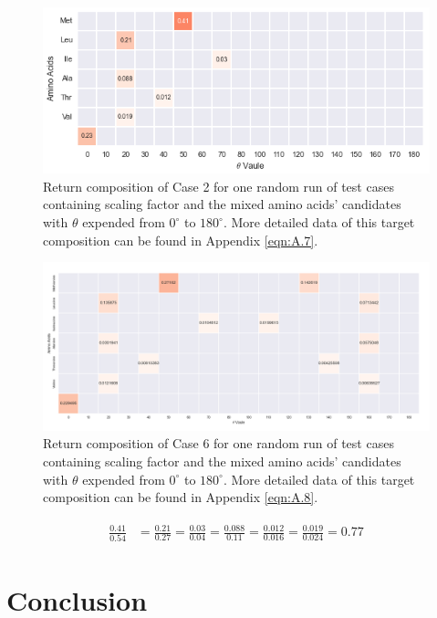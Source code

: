 \begin{figure}[!ht] 
\centering
\includegraphics[scale=0.9]{Figures/chapter6_figure_three.png}
\caption{Return composition of Case 2 for one random run of test cases containing scaling factor and the mixed amino acids' candidates with $\theta$ expended from $0^{\circ}$ to $180^{\circ}$. More detailed data of this target composition can be found in Appendix \ref{eqn:A.7}.} \label{fig:6.5}
\end{figure}

\begin{figure}[!ht] 
\centering
\includegraphics[scale=0.9]{Figures/chapter6_figure_four.png}
\caption{Return composition of Case 6 for one random run of test cases containing scaling factor and the mixed amino acids' candidates with $\theta$ expended from $0^{\circ}$ to $180^{\circ}$. More detailed data of this target composition can be found in Appendix \ref{eqn:A.8}.} \label{fig:6.6}
\end{figure}

\begin{eqnarray} 
\begin{split}
\frac{0.41}{0.54} &= \frac{0.21}{0.27} = \frac{0.03}{0.04}  =\frac{0.088}{0.11} = \frac{0.012}{0.016} = \frac{0.019}{0.024} = 0.77
\end{split}\label{eqn:6.2}
\end{eqnarray}

\section{Conclusion}

